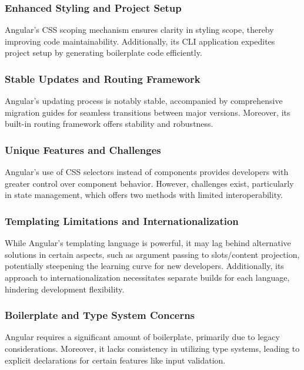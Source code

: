 \subsubsection{Enhanced Styling and Project Setup}

Angular's CSS scoping mechanism ensures clarity in styling scope, thereby improving code maintainability. Additionally, its CLI application expedites project setup by generating boilerplate code efficiently.

\subsubsection{Stable Updates and Routing Framework}

Angular's updating process is notably stable, accompanied by comprehensive migration guides for seamless transitions between major versions. Moreover, its built-in routing framework offers stability and robustness.

\subsubsection{Unique Features and Challenges}

Angular's use of CSS selectors instead of components provides developers with greater control over component behavior. However, challenges exist, particularly in state management, which offers two methods with limited interoperability.

\subsubsection{Templating Limitations and Internationalization}

While Angular's templating language is powerful, it may lag behind alternative solutions in certain aspects, such as argument passing to slots/content projection, potentially steepening the learning curve for new developers. Additionally, its approach to internationalization necessitates separate builds for each language, hindering development flexibility.

\subsubsection{Boilerplate and Type System Concerns}

Angular requires a significant amount of boilerplate, primarily due to legacy considerations. Moreover, it lacks consistency in utilizing type systems, leading to explicit declarations for certain features like input validation.

